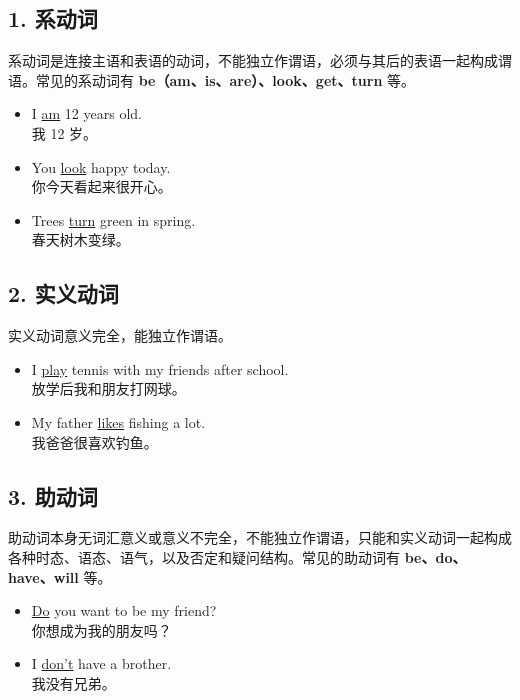 \documentclass[11pt,a4paper]{ctexart}
\begin{document}
\subsection*{1. 系动词}

系动词是连接主语和表语的动词，不能独立作谓语，必须与其后的表语一起构成谓语。常见的系动词有 \textbf{be（am、is、are）、look、get、turn} 等。

\begin{itemize}[leftmargin=1.4em]
\item I \underline{am} 12 years old.\\ 我 12 岁。
\item You \underline{look} happy today.\\ 你今天看起来很开心。
\item Trees \underline{turn} green in spring.\\ 春天树木变绿。
\end{itemize}

\subsection*{2. 实义动词}

实义动词意义完全，能独立作谓语。

\begin{itemize}[leftmargin=1.4em]
\item I \underline{play} tennis with my friends after school.\\ 放学后我和朋友打网球。
\item My father \underline{likes} fishing a lot.\\ 我爸爸很喜欢钓鱼。
\end{itemize}

\subsection*{3. 助动词}

助动词本身无词汇意义或意义不完全，不能独立作谓语，只能和实义动词一起构成各种时态、语态、语气，以及否定和疑问结构。常见的助动词有 \textbf{be、do、have、will} 等。

\begin{itemize}[leftmargin=1.4em]
\item \underline{Do} you want to be my friend?\\ 你想成为我的朋友吗？
\item I \underline{don’t} have a brother.\\ 我没有兄弟。
\end{itemize}
\end{document}
